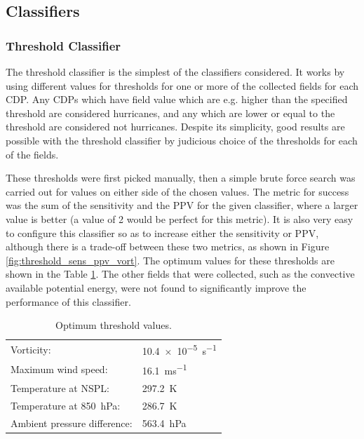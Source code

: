 \documentclass[pdftex,12pt,a4paper]{report}
\begin{document}
\subsection{Classifiers}


\subsubsection{Threshold Classifier}
The threshold classifier is the simplest of the classifiers considered. It works by using different
values for thresholds for one or more of the collected fields for each CDP. Any CDPs which have
field value which are e.g. higher than the specified threshold are considered hurricanes, and any
which are lower or equal to the threshold are considered not hurricanes. Despite its simplicity,
good results are possible with the threshold classifier by judicious choice of the thresholds for
each of the fields. 

These thresholds were first picked manually, then a simple brute force search was carried out for
values on either side of the chosen values. The metric for success was the sum of the sensitivity
and the PPV for the given classifier, where a larger value is better (a value of 2 would be perfect
for this metric). It is also very easy to configure this classifier so as to increase either the
sensitivity or PPV, although there is a trade-off between these two metrics, as shown in Figure
\ref{fig:threshold_sens_ppv_vort}. The optimum values for these thresholds are shown in the
Table \ref{tab:threshold_values}. The other fields that were collected, such as the convective
available potential energy, were not found to significantly improve the performance of this
classifier.

\begin{table}[hb!]
    \centering
    \begin{tabular}{ l l }
        Vorticity: & \SI{10.4e-5}{s^{-1}} \\
        Maximum wind speed: & \SI{16.1}{ms^{-1}} \\
        Temperature at NSPL: & \SI{297.2}{K} \\
        Temperature at \SI{850}{hPa}: & \SI{286.7}{K} \\
        Ambient pressure difference: & \SI{563.4}{hPa} \\
    \end{tabular}
    \caption{Optimum threshold values.}
    \label{tab:threshold_values}
\end{table}
\end{document}
